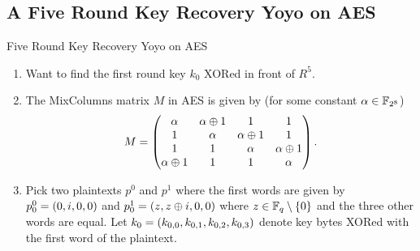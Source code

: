 \documentclass[notheorems]{beamer}
\theoremstyle{definition}
\theoremstyle{example}
\begin{document}
    \subsection{A Five Round Key Recovery Yoyo on AES}
    \label{subsec:aes-5-rounds-key}

    \begin{frame}[<+->]{Five Round Key Recovery Yoyo on AES}
        \begin{enumerate}
            \item Want to find the first round key \(k_0\) XORed in front of
            \(R^5\). 
            \item The MixColumns matrix \(M\) in AES is given by (for some
            constant \(\alpha \in \mathbb F_{2^8}\))
            \begin{equation}
                M = \begin{pmatrix}
                    \alpha & \alpha \oplus 1 & 1 & 1 \\
                    1 & \alpha & \alpha \oplus 1 & 1 \\
                    1 & 1 & \alpha & \alpha \oplus 1 \\
                    \alpha \oplus 1 & 1 & 1 & \alpha
                \end{pmatrix}.
            \end{equation}
            \item Pick two plaintexts \(p^0\) and \(p^1\) where the first
            words are given by \(p_0^0 = (0, i, 0, 0)\) and \(p_0^1 =
            (z, z \oplus i, 0, 0)\) where \(z \in \mathbb F_q \setminus
            \{0\}\) and the three other words are equal. Let \(k_0 =
            (k_{0, 0}, k_{0, 1}, k_{0, 2}, k_{0, 3})\) denote key bytes
            XORed with the first word of the plaintext. 
        \end{enumerate}
    \end{frame}
\end{document}
